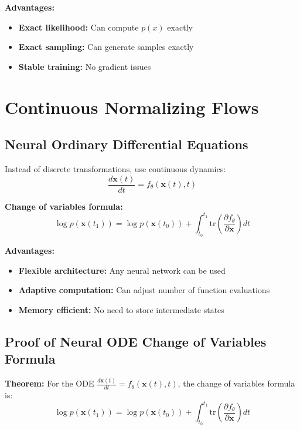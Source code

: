 \textbf{Advantages:}
\begin{itemize}
    \item \textbf{Exact likelihood:} Can compute $p(x)$ exactly
    \item \textbf{Exact sampling:} Can generate samples exactly
    \item \textbf{Stable training:} No gradient issues
\end{itemize}

\section{Continuous Normalizing Flows}

\subsection{Neural Ordinary Differential Equations}

Instead of discrete transformations, use continuous dynamics:
\begin{equation}
    \frac{d\mathbf{x}(t)}{dt} = f_\theta(\mathbf{x}(t), t)
\end{equation}

\textbf{Change of variables formula:}
\begin{equation}
    \log p(\mathbf{x}(t_1)) = \log p(\mathbf{x}(t_0)) + \int_{t_0}^{t_1} \text{tr}\left(\frac{\partial f_\theta}{\partial \mathbf{x}}\right) dt
\end{equation}

\textbf{Advantages:}
\begin{itemize}
    \item \textbf{Flexible architecture:} Any neural network can be used
    \item \textbf{Adaptive computation:} Can adjust number of function evaluations
    \item \textbf{Memory efficient:} No need to store intermediate states
\end{itemize}

\subsection{Proof of Neural ODE Change of Variables Formula}

\textbf{Theorem:} For the ODE $\frac{d\mathbf{x}(t)}{dt} = f_\theta(\mathbf{x}(t), t)$, the change of variables formula is:
\begin{equation}
    \log p(\mathbf{x}(t_1)) = \log p(\mathbf{x}(t_0)) + \int_{t_0}^{t_1} \text{tr}\left(\frac{\partial f_\theta}{\partial \mathbf{x}}\right) dt
\end{equation}

